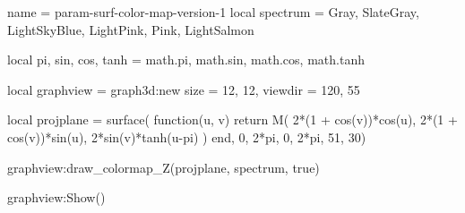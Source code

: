 \documentclass{standalone}
\begin{document}
\begin{luadraw}{name = param-surf-color-map-version-1}
local spectrum = {Gray, SlateGray, LightSkyBlue, LightPink, Pink, LightSalmon}

local pi, sin, cos, tanh = math.pi, math.sin, math.cos, math.tanh

local graphview = graph3d:new{
  size    = {12, 12},
  viewdir = {120, 55}
}

local projplane = surface(
  function(u, v)
    return M(
      2*(1 + cos(v))*cos(u),
      2*(1 + cos(v))*sin(u),
      2*sin(v)*tanh(u-pi)
    )
  end,
  0, 2*pi, 0,  2*pi,
  {51, 30})

graphview:draw_colormap_Z(projplane, spectrum, true)

graphview:Show()
\end{luadraw}
\end{document}
